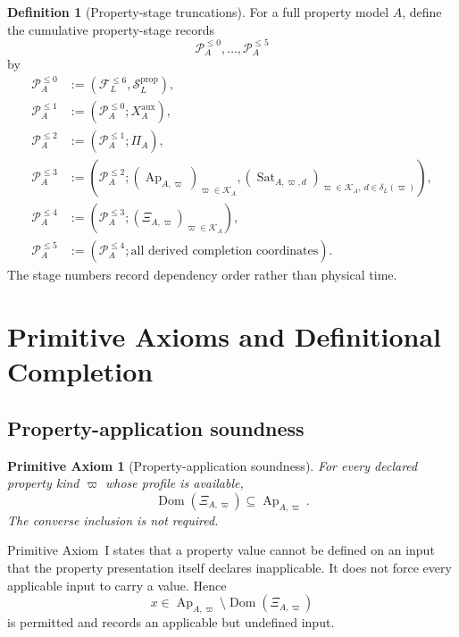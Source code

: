 \documentclass[11pt]{article}
\newcommand{\FVI}{\mathcal F_{L}^{\le 6}}
\newcommand{\Sprop}{\mathcal S_{L}^{\mathrm{prop}}}
\newcommand{\Ap}{\operatorname{Ap}}
\newcommand{\Sat}{\operatorname{Sat}}
\newcommand{\Dom}{\operatorname{Dom}}
\newtheorem{axiom}{Primitive Axiom}
\theoremstyle{definition}
\newtheorem{definition}[theorem]{Definition}
\theoremstyle{remark}
\begin{document}
\begin{definition}[Property-stage truncations]
\label{def:property-stages}
For a full property model \(A\), define the cumulative property-stage records
\[
\mathcal P_A^{\le0},\ldots,\mathcal P_A^{\le5}
\]
by
\[
\begin{aligned}
\mathcal P_A^{\le0}&:=(\FVI,\Sprop),\\
\mathcal P_A^{\le1}&:=(\mathcal P_A^{\le0};X_A^{\mathrm{aux}}),\\
\mathcal P_A^{\le2}&:=(\mathcal P_A^{\le1};\Pi_A),\\
\mathcal P_A^{\le3}&:=(\mathcal P_A^{\le2};
(\Ap_{A,\varpi})_{\varpi\in\mathcal K_A},
(\Sat_{A,\varpi,d})_{\varpi\in\mathcal K_A,\ d\in\delta_L(\varpi)}),\\
\mathcal P_A^{\le4}&:=(\mathcal P_A^{\le3};
(\Xi_{A,\varpi})_{\varpi\in\mathcal K_A}),\\
\mathcal P_A^{\le5}&:=(\mathcal P_A^{\le4};\text{all derived completion coordinates}).
\end{aligned}
\]
The stage numbers record dependency order rather than physical time.
\end{definition}

\section{Primitive Axioms and Definitional Completion}
\label{sec:axioms}

\subsection{Property-application soundness}

\begin{axiom}[Property-application soundness]
\label{ax:application}
For every declared property kind \(\varpi\) whose profile is available,
\[
\Dom(\Xi_{A,\varpi})\subseteq\Ap_{A,\varpi}.
\]
The converse inclusion is not required.
\end{axiom}

Primitive Axiom~I states that a property value cannot be defined on an input that the property presentation itself declares inapplicable.
It does not force every applicable input to carry a value.
Hence
\[
x\in\Ap_{A,\varpi}\setminus\Dom(\Xi_{A,\varpi})
\]
is permitted and records an applicable but undefined input.
\end{document}
